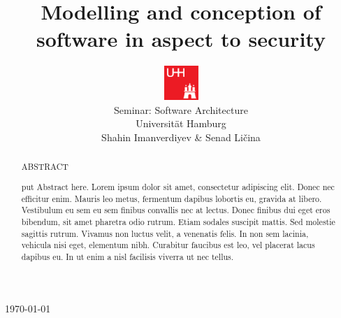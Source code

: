 \documentclass{acmtog} %
\begin{document}

\title{Modelling and conception of software in aspect to security} %

\author{
\parbox{4.2em}{\includegraphics[width=3.5em]{img/uhh}}%
\parbox{\textwidth}{
Seminar: Software Architecture \\
Universität Hamburg \\
Shahin Imanverdiyev \& Senad Ličina
}
}




\maketitle

\begin{bottomstuff}
\today
\end{bottomstuff}

\begin{abstract}
\begin{center}
ABSTRACT
\end{center}
put Abstract here.
Lorem ipsum dolor sit amet, consectetur adipiscing elit. Donec nec efficitur enim. Mauris leo metus, fermentum dapibus lobortis eu, gravida at libero. Vestibulum eu sem eu sem finibus convallis nec at lectus. Donec finibus dui eget eros bibendum, sit amet pharetra odio rutrum. Etiam sodales suscipit mattis. Sed molestie sagittis rutrum. Vivamus non luctus velit, a venenatis felis. In non sem lacinia, vehicula nisi eget, elementum nibh. Curabitur faucibus est leo, vel placerat lacus dapibus eu. In ut enim a nisl facilisis viverra ut nec tellus.
\end{abstract}
\end{document}

